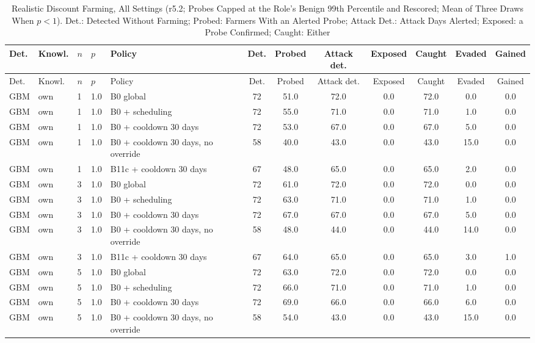 \documentclass[10pt,onecolumn,letterpaper]{article}
\begin{document}
\begin{longtable}{lllllccccccc}
\caption{Realistic Discount Farming, All Settings (r5.2; Probes Capped at the Role's Benign 99th Percentile and Rescored; Mean of Three Draws When $p<1$). Det.: Detected Without Farming; Probed: Farmers With an Alerted Probe; Attack Det.: Attack Days Alerted; Exposed: a Probe Confirmed; Caught: Either\label{tab:e-l3-r52}}\\
\toprule
Det. & Knowl. & $n$ & $p$ & Policy & Det. & Probed & Attack det. & Exposed & Caught & Evaded & Gained \\
\midrule
\endfirsthead
\toprule
Det. & Knowl. & $n$ & $p$ & Policy & Det. & Probed & Attack det. & Exposed & Caught & Evaded & Gained \\
\midrule
\endhead
GBM & own & 1 & 1.0 & B0 global & 72 & 51.0 & 72.0 & 0.0 & 72.0 & 0.0 & 0.0 \\
GBM & own & 1 & 1.0 & B0 + scheduling & 72 & 55.0 & 71.0 & 0.0 & 71.0 & 1.0 & 0.0 \\
GBM & own & 1 & 1.0 & B0 + cooldown 30 days & 72 & 53.0 & 67.0 & 0.0 & 67.0 & 5.0 & 0.0 \\
GBM & own & 1 & 1.0 & B0 + cooldown 30 days, no override & 58 & 40.0 & 43.0 & 0.0 & 43.0 & 15.0 & 0.0 \\
GBM & own & 1 & 1.0 & B11c + cooldown 30 days & 67 & 48.0 & 65.0 & 0.0 & 65.0 & 2.0 & 0.0 \\
GBM & own & 3 & 1.0 & B0 global & 72 & 61.0 & 72.0 & 0.0 & 72.0 & 0.0 & 0.0 \\
GBM & own & 3 & 1.0 & B0 + scheduling & 72 & 63.0 & 71.0 & 0.0 & 71.0 & 1.0 & 0.0 \\
GBM & own & 3 & 1.0 & B0 + cooldown 30 days & 72 & 67.0 & 67.0 & 0.0 & 67.0 & 5.0 & 0.0 \\
GBM & own & 3 & 1.0 & B0 + cooldown 30 days, no override & 58 & 48.0 & 44.0 & 0.0 & 44.0 & 14.0 & 0.0 \\
GBM & own & 3 & 1.0 & B11c + cooldown 30 days & 67 & 64.0 & 65.0 & 0.0 & 65.0 & 3.0 & 1.0 \\
GBM & own & 5 & 1.0 & B0 global & 72 & 63.0 & 72.0 & 0.0 & 72.0 & 0.0 & 0.0 \\
GBM & own & 5 & 1.0 & B0 + scheduling & 72 & 66.0 & 71.0 & 0.0 & 71.0 & 1.0 & 0.0 \\
GBM & own & 5 & 1.0 & B0 + cooldown 30 days & 72 & 69.0 & 66.0 & 0.0 & 66.0 & 6.0 & 0.0 \\
GBM & own & 5 & 1.0 & B0 + cooldown 30 days, no override & 58 & 54.0 & 43.0 & 0.0 & 43.0 & 15.0 & 0.0 \\

\end{longtable}
\end{document}
